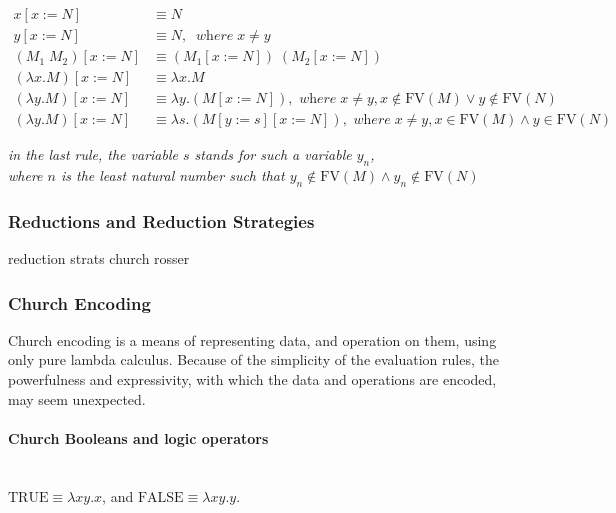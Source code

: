 \documentclass[a4paper,10pt]{article}
\begin{document}
\begin{align*}
	x[x := N] &\equiv N\\
	y[x := N] &\equiv N,\;\;\textit{where}\;x \not= y\\
	(M_1\;M_2)[x := N] &\equiv (M_1[x := N])\;(M_2[x := N])\\
	(\lambda x.M)[x := N] &\equiv \lambda x.M\\
	(\lambda y.M)[x := N] &\equiv \lambda y.(M[x := N]),\textit{ where}\;x \not= y, x \not\in \mathrm{FV}(M) \lor y \not\in \mathrm{FV}(N)\\
	(\lambda y.M)[x := N] &\equiv \lambda s.(M[y := s][x := N]),\textit{ where}\;x \not= y, x\in \mathrm{FV}(M) \land y \in \mathrm{FV}(N)
\end{align*}
\begin{center}
\textit{in the last rule, the variable $s$ stands for such a variable $y_n$,
\\where $n$ is the least natural number such that $y_n \not\in \mathrm{FV}(M) \land y_n \not\in \mathrm{FV}(N)$}
\end{center}

\subsubsection{Reductions and Reduction Strategies}

reduction strats
church rosser

\subsubsection{Church Encoding}
Church encoding is a means of representing data, and operation on them, using
only pure lambda calculus. Because of the simplicity of the evaluation rules, the powerfulness
and expressivity, with which the data and operations are encoded, may seem unexpected.

\paragraph{Church Booleans and logic operators}~\\

$\mathrm{TRUE} \equiv \lambda xy.x$, and $\mathrm{FALSE} \equiv \lambda xy.y$.
\end{document}
